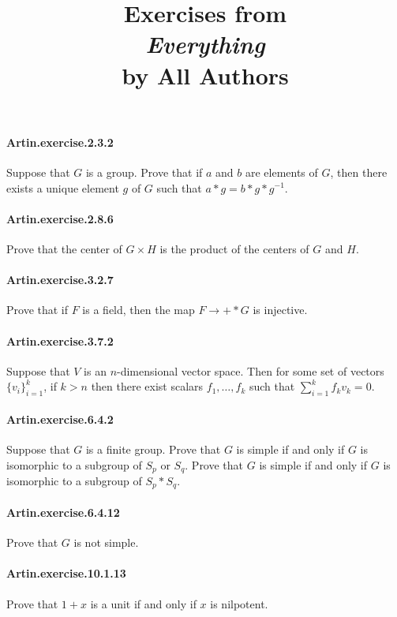 \documentclass{article}
\title{\textbf{
Exercises from \\
\textit{Everything} \\
by All Authors
}}
\date{}
\begin{document}
\maketitle

\paragraph{Artin.exercise.2.3.2} Suppose that $G$ is a group. Prove that if $a$ and $b$ are elements of $G$, then there exists a unique element $g$ of $G$ such that $a*g = b*g * g^{-1}$.

\paragraph{Artin.exercise.2.8.6} Prove that the center of $G \times H$ is the product of the centers of $G$ and $H$.

\paragraph{Artin.exercise.3.2.7} Prove that if $F$ is a field, then the map $F\to+*G$ is injective.

\paragraph{Artin.exercise.3.7.2} Suppose that $V$ is an $n$-dimensional vector space. Then for some set of vectors $\{v_i\}_{i=1}^k$, if $k>n$ then there exist scalars $f_1, \dots, f_k$ such that $\sum_{i=1}^k f_kv_k = 0$.

\paragraph{Artin.exercise.6.4.2} Suppose that $G$ is a finite group. Prove that $G$ is simple if and only if $G$ is isomorphic to a subgroup of $S_p$ or $S_q$. Prove that $G$ is simple if and only if $G$ is isomorphic to a subgroup of $S_p*S_q$.

\paragraph{Artin.exercise.6.4.12} Prove that $G$ is not simple.

\paragraph{Artin.exercise.10.1.13} Prove that $1 + x$ is a unit if and only if $x$ is nilpotent.
\end{document}
